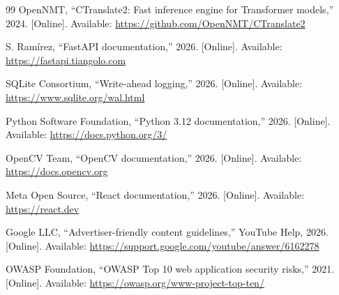 \documentclass[
12pt,
a4paper,
oneside
]{report}
\begin{document}
\begin{thebibliography}{99}
OpenNMT, ``CTranslate2: Fast inference engine for Transformer models,'' 2024.
[Online]. Available: \url{https://github.com/OpenNMT/CTranslate2}

S. Ram\'{i}rez, ``FastAPI documentation,'' 2026. [Online]. Available:
\url{https://fastapi.tiangolo.com}

SQLite Consortium, ``Write-ahead logging,'' 2026. [Online]. Available:
\url{https://www.sqlite.org/wal.html}

Python Software Foundation, ``Python 3.12 documentation,'' 2026. [Online].
Available: \url{https://docs.python.org/3/}

OpenCV Team, ``OpenCV documentation,'' 2026. [Online]. Available:
\url{https://docs.opencv.org}

Meta Open Source, ``React documentation,'' 2026. [Online]. Available:
\url{https://react.dev}

Google LLC, ``Advertiser-friendly content guidelines,'' YouTube Help, 2026.
[Online]. Available: \url{https://support.google.com/youtube/answer/6162278}

OWASP Foundation, ``OWASP Top 10 web application security risks,'' 2021.
[Online]. Available: \url{https://owasp.org/www-project-top-ten/}

\end{thebibliography}
\end{document}
